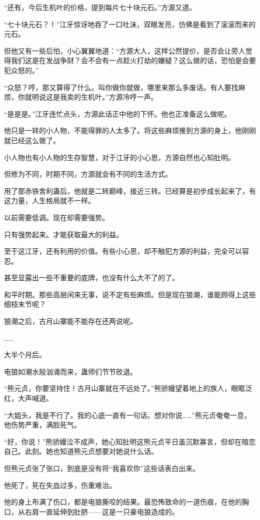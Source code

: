 \begin{this_body}
“还有，今后生机叶的价格，提到每片七十块元石。”方源又道。

“七十块元石？！”江牙惊讶地吞了一口吐沫，双眼发亮，仿佛是看到了滚滚而来的元石。

但他又有一些后怕，小心翼翼地道：“方源大人，这样公然提价，是否会让旁人觉得我们这是在发战争财？会不会有一点趁火打劫的嫌疑？这么做的话，恐怕是会要犯众怒的。”

“众怒？哼，那又算得了什么。叫你做你就做，哪里来那么多废话。有人要找麻烦，你就明说这是我卖的生机叶。”方源冷哼一声。

“是是是。”江牙连忙点头，方源此话正中他的下怀。他也正准备这么做呢。

他只是一转的小人物，不能得罪的人太多了。将这些麻烦推到方源的身上，他刚刚就已经这么做了。

小人物也有小人物的生存智慧，对于江牙的小心思，方源自然也心知肚明。

但修为不同，时期不同，方源就会有不同的生活方式。

用了那赤铁舍利蛊后，他就是二转巅峰，接近三转。已经算是初步成长起来了，有这力量，人生格局就不一样。

以前需要低调。现在却需要强势。

只有强势起来。才能获取最大的利益。

至于这江牙，还有利用的价值。有些小心思，却不触犯方源的利益，完全可以容忍。

甚至显露出一些不重要的底牌，也没有什么大不了的了。

和平时期。那些高层闲来无事，说不定有些麻烦。但是现在狼潮，谁能顾得上这些细枝末节呢？

狼潮之后，古月山寨能不能存在还两说呢。

……

大半个月后。

电狼如潮水般汹涌而来，蛊师们节节败退。

“熊元贞，你要坚持住！古月山寨就在不远处了。”熊骄嫚望着地上的族人，眼眶泛红，大声喊道。

“大姐头，我是不行了。我的心底一直有一句话。想对你说……”熊元贞奄奄一息，他伤势严重，满脸死气。

“好，你说！”熊骄嫚泣不成声，她心知肚明这熊元贞平日虽沉默寡言，但却在暗恋自己。此刻。她也知道熊元贞想要对她说什么话。

但熊元贞张了张口，到底是没有将“我喜欢你”这些话表白出来。

他死了，死在失血过多，伤重难治。

他的身上布满了伤口，都是电狼撕咬的结果。最恐怖致命的一道伤痕，在他的胸口，从右肩一直延伸到肚脐——这是一只豪电狼造成的。


\end{this_body}
